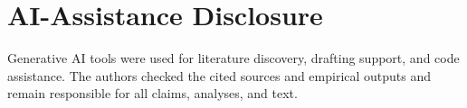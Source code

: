 \section{AI-Assistance Disclosure}
\label{sec:ai_disclosure}

Generative AI tools were used for literature discovery, drafting support, and
code assistance. The authors checked the cited sources and empirical outputs
and remain responsible for all claims, analyses, and text.
